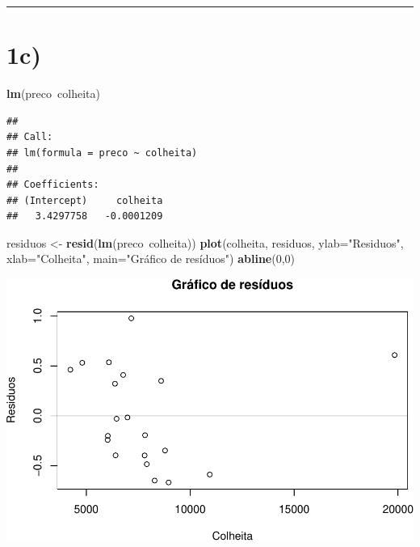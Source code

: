 \documentclass[11pt,]{article}
\makeatletter
\newenvironment{Shaded}{\begin{snugshade}}{\end{snugshade}}
\newcommand{\KeywordTok}[1]{\textcolor[rgb]{0.13,0.29,0.53}{\textbf{{#1}}}}
\newcommand{\DataTypeTok}[1]{\textcolor[rgb]{0.13,0.29,0.53}{{#1}}}
\newcommand{\DecValTok}[1]{\textcolor[rgb]{0.00,0.00,0.81}{{#1}}}
\newcommand{\StringTok}[1]{\textcolor[rgb]{0.31,0.60,0.02}{{#1}}}
\newcommand{\NormalTok}[1]{{#1}}
\def\maxwidth{\ifdim\Gin@nat@width>\linewidth\linewidth
\else\Gin@nat@width\fi}
\let\Oldincludegraphics\includegraphics
\renewcommand{\includegraphics}[1]{\Oldincludegraphics[width=\maxwidth]{#1}}
\makeatother
\begin{document}
\begin{center}\rule{0.5\linewidth}{\linethickness}\end{center}

\section{1c)}\label{c}

\begin{Shaded}
\begin{Highlighting}[]
\KeywordTok{lm}\NormalTok{(preco~colheita)}
\end{Highlighting}
\end{Shaded}

\begin{verbatim}
## 
## Call:
## lm(formula = preco ~ colheita)
## 
## Coefficients:
## (Intercept)     colheita  
##   3.4297758   -0.0001209
\end{verbatim}

\begin{Shaded}
\begin{Highlighting}[]
\NormalTok{residuos <-}\StringTok{ }\KeywordTok{resid}\NormalTok{(}\KeywordTok{lm}\NormalTok{(preco~colheita))}
\KeywordTok{plot}\NormalTok{(colheita, residuos,}
     \DataTypeTok{ylab=}\StringTok{"Residuos"}\NormalTok{,}
     \DataTypeTok{xlab=}\StringTok{"Colheita"}\NormalTok{,}
     \DataTypeTok{main=}\StringTok{"Gráfico de resíduos"}\NormalTok{) }
\KeywordTok{abline}\NormalTok{(}\DecValTok{0}\NormalTok{,}\DecValTok{0}\NormalTok{)}
\end{Highlighting}
\end{Shaded}

\includegraphics{versaofinal_lista3_files/figure-latex/unnamed-chunk-4-1.pdf}
\end{document}
